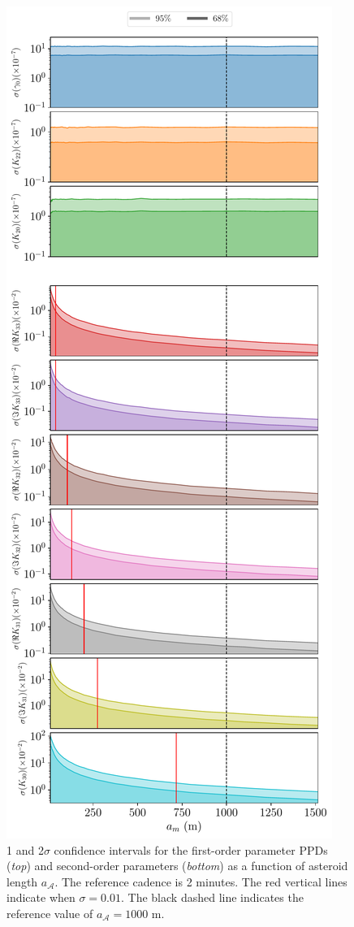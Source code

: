 \documentclass[fleqn,usenatbib]{mnras}
\begin{document}
\begin{figure}
  \centering
  \includegraphics[height=0.89\textheight]{figs/scan-am.pdf}
  \caption{1 and 2$\sigma$ confidence intervals for the first-order parameter PPDs (\textit{top}) and second-order parameters (\textit{bottom}) as a function of asteroid length $a_\mathcal{A}$. The reference cadence is 2 minutes. The red vertical lines indicate when $\sigma = 0.01$. The black dashed line indicates the reference value of $a_\mathcal{A}=1000$ m.}
  \label{fig:scan-am}
\end{figure}
\end{document}
